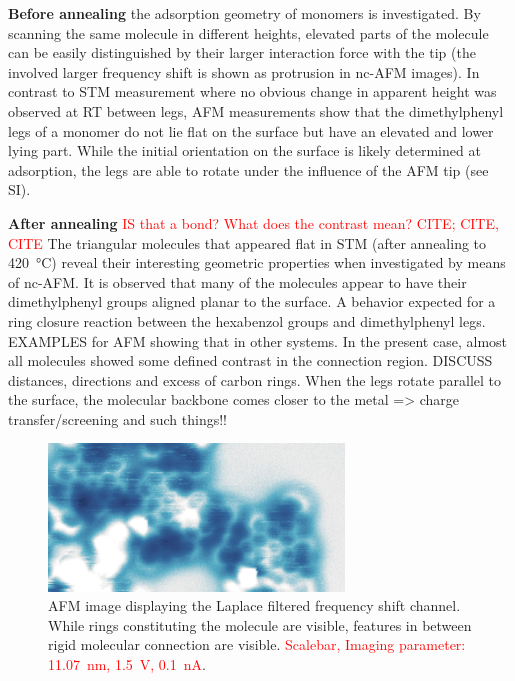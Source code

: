 \textbf{Before annealing} the adsorption geometry of monomers is investigated. By scanning the same molecule in different heights, elevated parts of the molecule can be easily distinguished by their larger interaction force with the tip (the involved larger frequency shift is shown as protrusion in nc-AFM images). In contrast to STM measurement where no obvious change in apparent height was observed at RT between legs, AFM measurements show that the dimethylphenyl legs of a monomer do not lie flat on the surface but have an elevated and lower lying part. While the initial orientation on the surface is likely determined at adsorption, the legs are able to rotate under the influence of the AFM tip (see SI).

\textbf{After annealing} \textcolor{red}{IS that a bond? What does the contrast mean? CITE; CITE, CITE}
The triangular molecules that appeared flat in STM (after annealing to \SI{420}{\celsius}) reveal their interesting geometric properties when investigated by means of nc-AFM. It is observed that many of the molecules appear to have their dimethylphenyl groups aligned planar to the surface. A behavior expected for a ring closure reaction between the hexabenzol groups and dimethylphenyl legs. EXAMPLES for AFM showing that in other systems. In the present case, almost all molecules showed some defined contrast in the connection region. DISCUSS distances, directions and excess of carbon rings.
When the legs rotate parallel to the surface, the molecular backbone comes closer to the metal => charge transfer/screening and such things!!

\begin{figure}[] \centering
	\includegraphics[width=0.7\textwidth]{./images/hbbnc-annealed-afm}
	\caption{AFM image displaying the Laplace filtered frequency shift channel. While rings constituting the molecule are visible, features in between rigid molecular connection are visible. \textcolor{red}{Scalebar, Imaging parameter: \SI{11.07}{\nano \meter}, \SI{1.5}{\volt}, \SI{0.1}{\nano \ampere}}.}
	\label{}
\end{figure}

